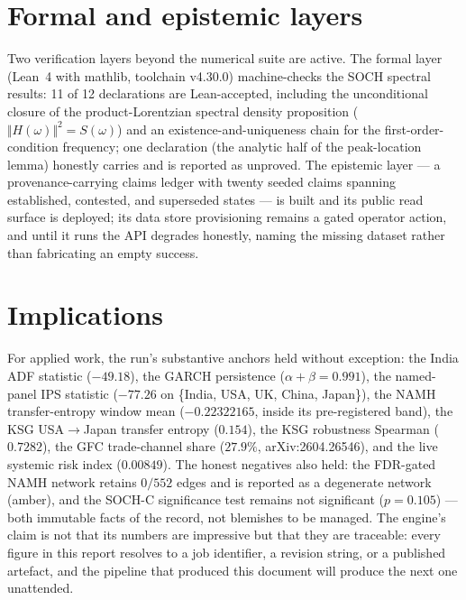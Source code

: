 \section{Formal and epistemic layers}
Two verification layers beyond the numerical suite are active. The formal
layer (Lean~4 with mathlib, toolchain v4.30.0) machine-checks the SOCH
spectral results: 11 of 12 declarations are Lean-accepted, including the
unconditional closure of the product-Lorentzian spectral density
proposition ($\Vert H(\omega)\Vert^{2} = S(\omega)$) and an
existence-and-uniqueness chain for the first-order-condition frequency; one
declaration (the analytic half of the peak-location lemma) honestly carries
 and is reported as unproved. The epistemic layer --- a
provenance-carrying claims ledger with twenty seeded claims spanning
established, contested, and superseded states --- is built and its public
read surface is deployed; its data store provisioning remains a gated
operator action, and until it runs the API degrades honestly, naming the
missing dataset rather than fabricating an empty success.

\section{Implications}
For applied work, the run's substantive anchors held without exception:
the India ADF statistic ($-49.18$), the GARCH persistence ($\alpha + \beta =
0.991$), the named-panel IPS statistic ($-77.26$ on
\{India, USA, UK, China, Japan\}), the NAMH transfer-entropy window mean
($-0.22322165$, inside its pre-registered band), the KSG USA$\to$Japan
transfer entropy ($0.154$), the KSG robustness Spearman ($0.7282$), the
GFC trade-channel share ($27.9\%$, arXiv:2604.26546), and the live systemic
risk index ($0.00849$). The honest negatives also held: the FDR-gated NAMH
network retains $0/552$ edges and is reported as a degenerate network
(amber), and the SOCH-C significance test remains not significant
($p=0.105$) --- both immutable facts of the record, not blemishes to be
managed. The engine's claim is not that its numbers are impressive but that
they are traceable: every figure in this report resolves to a job
identifier, a revision string, or a published artefact, and the pipeline
that produced this document will produce the next one unattended.

